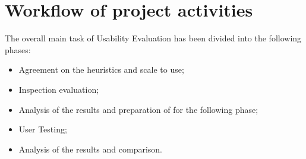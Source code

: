 \section{Workflow of project activities}
The overall main task of Usability Evaluation has been divided into the following phases:

\begin{itemize}
	\item Agreement on the heuristics and scale to use;
	\item Inspection evaluation;
	\item Analysis of the results and preparation of for the following phase;
	\item User Testing;
	\item Analysis of the results and comparison.
\end{itemize}

